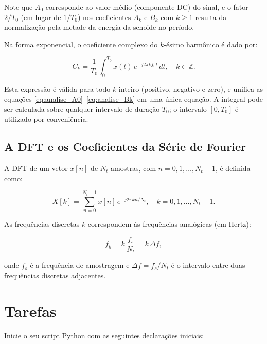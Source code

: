\documentclass[a4paper,twoside,12pt]{article}
\begin{document}
	Note que $A_0$ corresponde ao valor médio (componente DC) do sinal, e o fator $2/T_0$ (em lugar de $1/T_0$) nos coeficientes $A_k$ e $B_k$ com $k \geq 1$ resulta da normalização pela metade da energia da senoide no período.
	
	Na forma exponencial, o coeficiente complexo do $k$-ésimo harmônico é dado por:
	
	\begin{equation}
		C_k = \frac{1}{T_0} \int_0^{T_0} x(t) \, e^{-j2\pi k f_0 t} \, dt, \quad k \in \mathbb{Z}.
		\label{eq:analise_Ck}
	\end{equation}
	
	\noindent Esta expressão é válida para todo $k$ inteiro (positivo, negativo e zero), e unifica as equações \eqref{eq:analise_A0}--\eqref{eq:analise_Bk} em uma única equação. A integral pode ser calculada sobre qualquer intervalo de duração $T_0$; o intervalo $[0, T_0]$ é utilizado por conveniência.
	
	\subsection{A DFT e os Coeficientes da Série de Fourier}
	
	A DFT de um vetor $x[n]$ de $N_t$ amostras, com $n = 0, 1, \ldots, N_t-1$, é definida como:
	
	\begin{equation}
		X[k] = \sum_{n=0}^{N_t-1} x[n] \, e^{-j2\pi kn/N_t}, \quad k = 0, 1, \ldots, N_t-1.
		\label{eq:dft}
	\end{equation}
	
	As frequências discretas $k$ correspondem às frequências analógicas (em Hertz):
	
	\begin{equation}
		f_k = k \, \frac{f_s}{N_t} = k \, \Delta f,
		\label{eq:freq_discreta}
	\end{equation}
	
	\noindent onde $f_s$ é a frequência de amostragem e $\Delta f = f_s / N_t$ é o intervalo entre duas frequências discretas adjacentes. 
	
	\section{Tarefas}
	\label{sec:tarefas}
	
	Inicie o seu script Python com as seguintes declarações iniciais:
	
\end{document}
